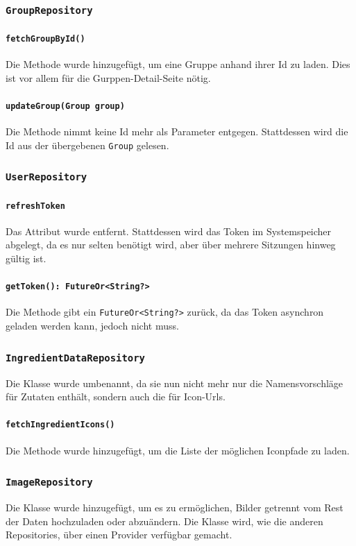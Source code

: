 \documentclass{implementierungsheft}
\begin{document}
\subsubsection{\texttt{GroupRepository}}
\paragraph*{\texttt{fetchGroupById()}} Die Methode wurde hinzugefügt, um eine Gruppe anhand ihrer Id zu laden. Dies ist vor allem für die Gurppen-Detail-Seite nötig.
\paragraph*{\texttt{updateGroup(Group group)}} Die Methode nimmt keine Id mehr als Parameter entgegen. Stattdessen wird die Id aus der übergebenen \texttt{Group} gelesen.
\subsubsection{\texttt{UserRepository}}
\paragraph{\texttt{refreshToken}}
Das Attribut wurde entfernt. Stattdessen wird das Token im Systemspeicher abgelegt, da es nur selten benötigt wird, aber über mehrere Sitzungen hinweg gültig ist.
\paragraph{\texttt{getToken(): FutureOr<String?>}} Die Methode gibt ein \texttt{FutureOr<String?>} zurück, da das Token asynchron geladen werden kann, jedoch nicht muss.
\subsubsection{\texttt{IngredientDataRepository}}
Die Klasse wurde umbenannt, da sie nun nicht mehr nur die Namensvorschläge für Zutaten enthält, sondern auch die für Icon-Urls.
\paragraph{\texttt{fetchIngredientIcons()}} Die Methode wurde hinzugefügt, um die Liste der möglichen Iconpfade zu laden.
\subsubsection{\texttt{ImageRepository}}
Die Klasse wurde hinzugefügt, um es zu ermöglichen, Bilder getrennt vom Rest der Daten hochzuladen oder abzuändern. Die Klasse wird, wie die anderen Repositories, über einen Provider verfügbar gemacht.
\end{document}
